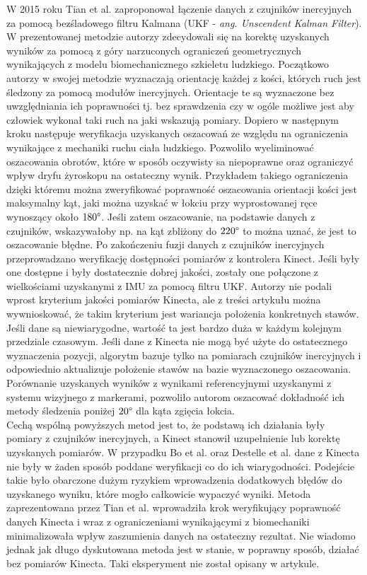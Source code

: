	W 2015 roku Tian et al. \cite{Tian2015a} zaproponował łączenie danych z czujników inercyjnych za pomocą bezśladowego filtru Kalmana (UKF - \emph{ang. Unscendent Kalman Filter}). W prezentowanej metodzie autorzy zdecydowali się na korektę uzyskanych wyników za pomocą z góry narzuconych ograniczeń geometrycznych wynikających z modelu biomechanicznego szkieletu ludzkiego. Początkowo autorzy w swojej metodzie wyznaczają orientację każdej z kości, których ruch jest śledzony za pomocą modułów inercyjnych. Orientacje te są wyznaczone bez uwzględniania ich poprawności tj. bez sprawdzenia czy w ogóle możliwe jest aby człowiek wykonał taki ruch na jaki wskazują pomiary. Dopiero w następnym kroku następuje weryfikacja uzyskanych oszacowań ze względu na ograniczenia wynikające z mechaniki ruchu ciała ludzkiego. Pozwoliło wyeliminować oszacowania obrotów, które w sposób oczywisty sa niepoprawne oraz ograniczyć wpływ dryfu żyroskopu na ostateczny wynik. Przykładem takiego ograniczenia dzięki któremu można zweryfikować poprawność oszacowania orientacji kości jest maksymalny kąt, jaki można uzyskać w łokciu przy wyprostowanej ręce wynoszący około $180\degree$. Jeśli zatem oszacowanie, na podstawie danych z czujników, wskazywałoby np. na kąt zbliżony do $220\degree$ to można uznać, że jest to oszacowanie błędne. Po zakończeniu fuzji danych z czujników inercyjnych przeprowadzano weryfikację dostępności pomiarów z kontrolera Kinect. Jeśli były one dostępne i były dostatecznie dobrej jakości, zostały one połączone z wielkościami uzyskanymi z IMU za pomocą filtru UKF. Autorzy nie podali wprost kryterium jakości pomiarów Kinecta, ale z treści artykułu można wywnioskować, że takim kryterium jest wariancja położenia konkretnych stawów. Jeśli dane są niewiarygodne, wartość ta jest bardzo duża w każdym kolejnym przedziale czasowym. Jeśli dane z Kinecta nie mogą być użyte do ostatecznego wyznaczenia pozycji, algorytm bazuje tylko na pomiarach czujników inercyjnych i odpowiednio aktualizuje położenie stawów na bazie wyznaczonego oszacowania. Porównanie uzyskanych wyników z wynikami referencyjnymi uzyskanymi z systemu wizyjnego z markerami, pozwoliło autorom oszacować dokładność ich metody śledzenia poniżej $20\degree$ dla kąta zgięcia łokcia.\\
		
	Cechą wspólną powyższych metod jest to, że podstawą ich działania były pomiary z czujników inercyjnych, a Kinect stanowił uzupełnienie lub korektę uzyskanych pomiarów. W przypadku Bo et al. oraz Destelle et al. dane z Kinecta nie były w żaden sposób poddane weryfikacji co do ich wiarygodności. Podejście takie było obarczone dużym ryzykiem wprowadzenia dodatkowych błędów do uzyskanego wyniku, które mogło całkowicie wypaczyć wyniki. Metoda zaprezentowana przez Tian et al. wprowadziła krok weryfikujący poprawność danych Kinecta i wraz z ograniczeniami wynikającymi z biomechaniki minimalizowała wpływ zaszumienia danych na ostateczny rezultat. Nie wiadomo jednak jak długo dyskutowana metoda jest w stanie, w poprawny sposób, działać bez pomiarów Kinecta. Taki eksperyment nie został opisany w artykule.\\\\
		
